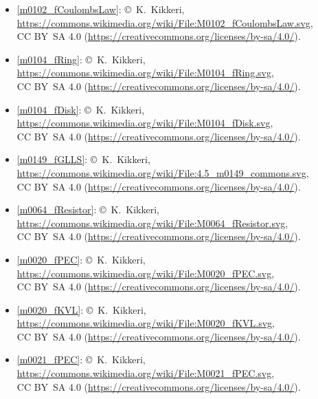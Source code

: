 \begin{itemize}

\item[Fig.] \label{m0102_fCoulombsLaw_Credit}
  \ref{m0102_fCoulombsLaw}:
  \copyright~K.\ Kikkeri, 
  \url{https://commons.wikimedia.org/wiki/File:M0102_fCoulombsLaw.svg},\\ 
  CC BY~SA 4.0 (\url{https://creativecommons.org/licenses/by-sa/4.0/}).

\item[Fig.] \label{m0104_fRing_Credit}
  \ref{m0104_fRing}:
  \copyright~K.\ Kikkeri, 
  \url{https://commons.wikimedia.org/wiki/File:M0104_fRing.svg},\\ 
  CC BY~SA 4.0 (\url{https://creativecommons.org/licenses/by-sa/4.0/}).

\item[Fig.] \label{m0104_fDisk_Credit}
  \ref{m0104_fDisk}:
  \copyright~K.\ Kikkeri, 
  \url{https://commons.wikimedia.org/wiki/File:M0104_fDisk.svg},\\ 
  CC BY~SA 4.0 (\url{https://creativecommons.org/licenses/by-sa/4.0/}).

\item[Fig.] \label{m0149_fGLLS_Credit}
  \ref{m0149_fGLLS}:
  \copyright~K.\ Kikkeri, 
  \url{https://commons.wikimedia.org/wiki/File:4.5_m0149_commons.svg},\\ 
  CC BY~SA 4.0 (\url{https://creativecommons.org/licenses/by-sa/4.0/}).

\item[Fig.] \label{m0064_fResistor_Credit}
  \ref{m0064_fResistor}:
  \copyright~K.\ Kikkeri, 
  \url{https://commons.wikimedia.org/wiki/File:M0064_fResistor.svg},\\ 
  CC BY~SA 4.0 (\url{https://creativecommons.org/licenses/by-sa/4.0/}).

\item[Fig.] \label{m0020_fPEC_Credit}
  \ref{m0020_fPEC}:
  \copyright~K.\ Kikkeri, 
  \url{https://commons.wikimedia.org/wiki/File:M0020_fPEC.svg},\\ 
  CC BY~SA 4.0 (\url{https://creativecommons.org/licenses/by-sa/4.0/}).

\item[Fig.] \label{m0020_fKVL_Credit}
  \ref{m0020_fKVL}:
  \copyright~K.\ Kikkeri, 
  \url{https://commons.wikimedia.org/wiki/File:M0020_fKVL.svg},\\ 
  CC BY~SA 4.0 (\url{https://creativecommons.org/licenses/by-sa/4.0/}).

\item[Fig.] \label{m0021_fPEC_Credit}
  \ref{m0021_fPEC}:
  \copyright~K.\ Kikkeri, 
  \url{https://commons.wikimedia.org/wiki/File:M0021_fPEC.svg},\\ 
  CC BY~SA 4.0 (\url{https://creativecommons.org/licenses/by-sa/4.0/}).


\end{itemize}

